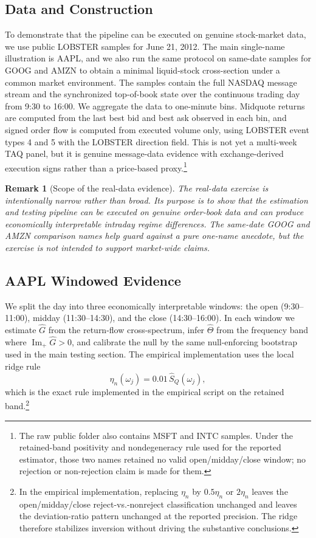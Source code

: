 \documentclass[11pt]{article}
\newtheorem{remark}[theorem]{Remark}
\newcommand{\ImPart}{\operatorname{Im}_{\!+}}
\newcommand{\REV}{}
\begin{document}
\subsection{Data and Construction}
To demonstrate that the pipeline can be executed on genuine stock-market data, we use public LOBSTER samples for June 21, 2012. The main single-name illustration is AAPL, and we also run the same protocol on same-date samples for GOOG and AMZN to obtain a minimal liquid-stock cross-section under a common market environment. The samples contain the full NASDAQ message stream and the synchronized top-of-book state over the continuous trading day from 9:30 to 16:00. We aggregate the data to one-minute bins. Midquote returns are computed from the last best bid and best ask observed in each bin, and signed order flow is computed from executed volume only, using LOBSTER event types 4 and 5 with the LOBSTER direction field. This is not yet a multi-week TAQ panel, but it is genuine message-data evidence with exchange-derived execution signs rather than a price-based proxy.\footnote{The raw public folder also contains MSFT and INTC samples. Under the retained-band positivity and nondegeneracy rule used for the reported estimator, those two names retained no valid open/midday/close window; no rejection or non-rejection claim is made for them.}

\begin{remark}[Scope of the real-data evidence]
The real-data exercise is intentionally narrow rather than broad. Its purpose is to show that the estimation and testing pipeline can be executed on genuine order-book data and can produce economically interpretable intraday regime differences. The same-date GOOG and AMZN comparison names help guard against a pure one-name anecdote, but the exercise is not intended to support market-wide claims.
\end{remark}

\subsection{AAPL Windowed Evidence}
\REV
We split the day into three economically interpretable windows: the open (9:30--11:00), midday (11:30--14:30), and the close (14:30--16:00). In each window we estimate $\widehat{G}$ from the return-flow cross-spectrum, infer $\widehat{\Theta}$ from the frequency band where $\ImPart\widehat{G}>0$, and calibrate the null by the same null-enforcing bootstrap used in the main testing section. The empirical implementation uses the local ridge rule
\[
  \eta_n(\omega_j)=0.01\,\widehat S_Q(\omega_j),
\]
which is the exact rule implemented in the empirical script on the retained band.\footnote{\REV In the empirical implementation, replacing $\eta_n$ by $0.5\eta_n$ or $2\eta_n$ leaves the open/midday/close reject-vs.-nonreject classification unchanged and leaves the deviation-ratio pattern unchanged at the reported precision. The ridge therefore stabilizes inversion without driving the substantive conclusions.}
\end{document}
